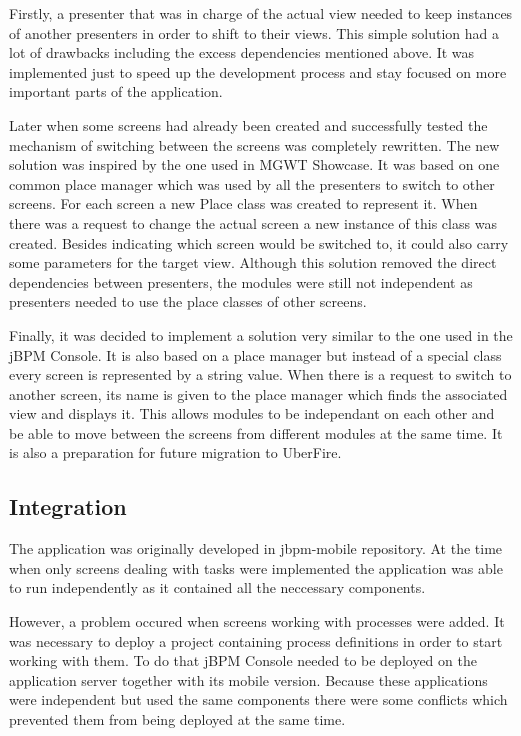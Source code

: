 \documentclass[12pt,oneside,final]{fithesis2}
\begin{document}
Firstly, a presenter that was in charge of the actual view needed to keep instances of another presenters in order to shift to their views.
This simple solution had a lot of drawbacks including the excess dependencies mentioned above.
It was implemented just to speed up the development process and stay focused on more important parts of the application.

Later when some screens had already been created and successfully tested the mechanism of switching between the screens was completely rewritten.
The new solution was inspired by the one used in MGWT Showcase\footnotemark{}.
It was based on one common place manager which was used by all the presenters to switch to other screens.
For each screen a new Place class was created to represent it.
When there was a request to change the actual screen a new instance of this class was created.
Besides indicating which screen would be switched to, it could also carry some parameters for the target view.
Although this solution removed the direct dependencies between presenters, the modules were still not independent as presenters needed to use the place classes of other screens.

Finally, it was decided to implement a solution very similar to the one used in the jBPM Console.
It is also based on a place manager but instead of a special class every screen is represented by a string value.
When there is a request to switch to another screen, its name is given to the place manager which finds the associated view and displays it.
This allows modules to be independant on each other and be able to move between the screens from different modules at the same time.
It is also a preparation for future migration to UberFire.

\subsection{Integration}
\label{subsec:integration}
The application was originally developed in jbpm-mobile\footnotemark{} repository.
At the time when only screens dealing with tasks were implemented the application was able to run independently as it contained all the neccessary components.

However, a problem occured when screens working with processes were added.
It was necessary to deploy a project containing process definitions in order to start working with them.
To do that jBPM Console needed to be deployed on the application server together with its mobile version.
Because these applications were independent but used the same components there were some conflicts which prevented them from being deployed at the same time.
\end{document}
